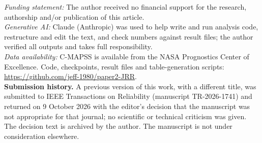 \documentclass[11pt,a4paper]{article}
\begin{document}
\textit{Funding statement:} The author received no financial support for the research, authorship and/or publication of this article.\\
\textit{Generative AI:} Claude (Anthropic) was used to help write and run analysis code, restructure and edit the text, and check numbers against result files; the author verified all outputs and takes full responsibility.\\
\textit{Data availability:} C-MAPSS is available from the NASA Prognostics Center of Excellence. Code, checkpoints, result files and table-generation scripts: \url{https://github.com/jeff-1980/paper2-JRR}.\\[0.6em]
\noindent\textbf{Submission history.} A previous version of this work, with a different title, was submitted to IEEE Transactions on Reliability (manuscript TR-2026-1741) and returned on 9 October 2026 with the editor's decision that the manuscript was not appropriate for that journal; no scientific or technical criticism was given. The decision text is archived by the author. The manuscript is not under consideration elsewhere.\\[0.6em]
\end{document}
